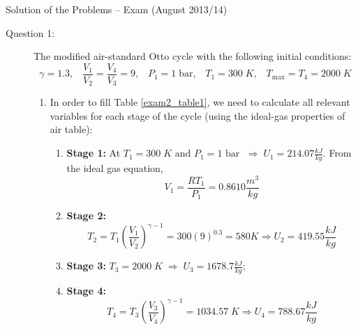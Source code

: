 \documentclass[12pt,twoside]{report}
\newcommand{\frc}{\displaystyle\frac}
\begin{document}
\setcounter{page}{1}

\vfill

\pagebreak


\begin{center}
{\Large Solution of the Problems -- Exam (August 2013/14)}
\end{center}

\begin{description}

\item [Question 1:] The modified air-standard Otto cycle with the following initial conditions:
\begin{displaymath}
\gamma = 1.3,\;\;\; \frc{V_{1}}{V_{2}}=\frc{V_{4}}{V_{3}}=9, \;\;\; P_{1}= 1\;\text{bar}, \;\;\; T_{1}=300\;K, \;\;\; T_{\text{max}}=T_{4}=2000\;K
\end{displaymath}

\begin{enumerate}
\item In order to fill Table \ref{exam2_table1}, we need to calculate all relevant variables for each stage of the cycle (using the ideal-gas properties of air table):
\begin{enumerate}
\item {\bf Stage 1:} At $T_{1}=300\;K\text{ and }P_{1}=1\text{ bar }\;\Rightarrow\;U_{1}=214.07\frc{kJ}{kg}$. From the ideal gas equation,
\begin{displaymath}
V_{1}=\frc{R T_{1}}{P_{1}}= 0.8610 \frc{m^{3}}{kg}
\end{displaymath}
\item {\bf Stage 2:}
\begin{displaymath}
T_{2}=T_{1}\left(\frc{V_{1}}{V_{2}}\right)^{\gamma-1}=300\left(9\right)^{0.3}=580K \Rightarrow U_{2}=419.55\frc{kJ}{kg}
\end{displaymath}
\item {\bf Stage 3:} $T_{3}=2000\;K\;\Rightarrow\;U_{3}=1678.7\frc{kJ}{kg}$;
\item {\bf Stage 4:} 
\begin{displaymath}
T_{4}=T_{3}\left(\frc{V_{3}}{V_{4}}\right)^{\gamma-1}=1034.57\; K \Rightarrow U_{4}=788.67\frc{kJ}{kg}
\end{displaymath}
\end{enumerate}


\end{enumerate}
\end{description}
\end{document}
